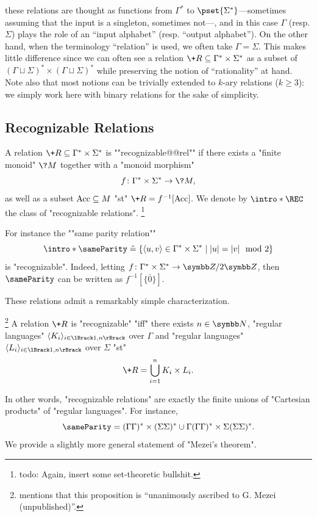 these relations are thought as functions from $\Gamma^*$ to $\pset{\Sigma^*}$---sometimes
assuming that the input is a singleton, sometimes not---,
and in this case $\Gamma$ (resp. $\Sigma$) plays the role of an ``input alphabet''
(resp. ``output alphabet''). On the other hand, when the terminology ``relation'' is used,
we often take $\Gamma = \Sigma$. This makes little difference since we can often
see a relation $\+R \subseteq \Gamma^* \times \Sigma^*$ as a subset of
$(\Gamma\sqcup \Sigma)^* \times (\Gamma\sqcup \Sigma)^*$
while preserving the notion of ``rationality'' at hand.
Note also that most notions can be trivially extended to $k$-ary relations ($k \geq 3$):
we simply work here with binary relations for the sake of simplicity.


\subsection{Recognizable Relations}

A relation $\+R \subseteq \Gamma^* \times \Sigma^*$ is \AP""recognizable@@rel""
if there exists a "finite monoid" $\?M$ together with a "monoid morphism"
\[
	f\colon \Gamma^* \times \Sigma^* \to \?M,
\]
as well as a subset $\textrm{Acc} \subseteq M$ "st"
$\+R = f^{-1}[\Acc]$. We denote by \AP$\intro*\REC$ the class of "recognizable relations".%
\footnote{todo: Again, insert some set-theoretic bullshit.}

For instance the \AP""same parity relation""
\[
	{\intro*\sameParity} \defeq 
	\{
		\tup{u,v} \in \Gamma^* \times \Sigma^* \mid
		|u| = |v| \mod{2}
	\}
\]
is "recognizable". Indeed, letting $f\colon  \Gamma^* \times \Sigma^* \to \ZnZ{2}$,
then $\sameParity$ can be written as $f^{-1}[\{\bar 0\}]$.

These relations admit a remarkably simple characterization.\AP
\begin{proposition}
	\!\footnote{\cite[\S~2, ``Notes \& references'']{Sakarovitch2009Elements} mentions
	that this proposition is ``unanimously ascribed to G. Mezei (unpublished)''.}
	\label{prop:Mezei-theorem}
	A relation $\+R$ is "recognizable" "iff" there exists $n\in\N$,
	"regular languages" $\tup{K_i}_{i\in \lBrack 1,n\rBrack}$ over $\Gamma$
	and "regular languages" $\tup{L_i}_{i\in \lBrack 1,n\rBrack}$ over $\Sigma$
	"st"
	\[
		\+R = \bigcup_{i=1}^n K_i \times L_i.
	\]
\end{proposition}

In other words, "recognizable relations" are exactly the finite unions of
"Cartesian products" of "regular languages".
For instance, \[{\sameParity} =
(\Gamma\Gamma)^* \times (\Sigma\Sigma)^*
\cup \Gamma(\Gamma\Gamma)^* \times \Sigma(\Sigma\Sigma)^*.\]
We provide a slightly more general statement of "Mezei's theorem".

